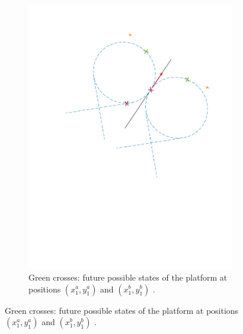 \begin{itemize}
\begin{figure}[!htbp]
\begin{subfigure}[b]{0.45\textwidth}
        \includegraphics[width=\textwidth]{img/circular_movment6.pdf}
        \caption{Green crosses: future possible states of the platform at positions $(x_1^a,y_1^a)$ and $(x_1^b,y_1^b)$ .}
        \label{fig:six}
   \end{subfigure}
   

\end{figure}
\end{itemize}
